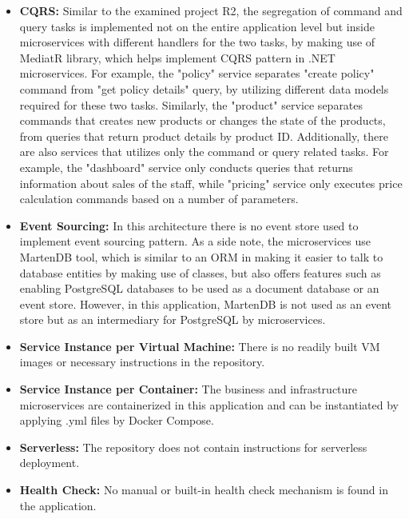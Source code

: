 \documentclass{Configuration_Files/PoliMi3i_thesis}
\begin{document}
\begin{itemize}
    \item \textbf{CQRS:} Similar to the examined project R2, the segregation of command and query tasks is implemented not on the entire application level but inside microservices with different handlers for the two tasks, by making use of MediatR library, which helps implement CQRS pattern in .NET microservices.
    For example, the "policy" service separates "create policy" command from "get policy details" query, by utilizing different data models required for these two tasks.
    Similarly, the "product" service separates commands that creates new products or changes the state of the products, from queries that return product details by product ID.
    Additionally, there are also services that utilizes only the command or query related tasks.
    For example, the "dashboard" service only conducts queries that returns information about sales of the staff, while "pricing" service only executes price calculation commands based on a number of parameters.
    
    \item \textbf{Event Sourcing:} In this architecture there is no event store used to implement event sourcing pattern.
    As a side note, the microservices use MartenDB\footnotemark[105] tool, which is similar to an ORM in making it easier to talk to database entities by making use of classes, but also offers features such as enabling PostgreSQL databases to be used as a document database or an event store.
    However, in this application, MartenDB is not used as an event store but as an intermediary for PostgreSQL by microservices.
    
    \item \textbf{Service Instance per Virtual Machine:} There is no readily built VM images or necessary instructions in the repository.
    
    \item \textbf{Service Instance per Container:} The business and infrastructure microservices are containerized in this application and can be instantiated by applying .yml files by Docker Compose.
    
    \item \textbf{Serverless:} The repository does not contain instructions for serverless deployment.
    
    \item \textbf{Health Check:} No manual or built-in health check mechanism is found in the application.
    

\end{itemize}
\end{document}
